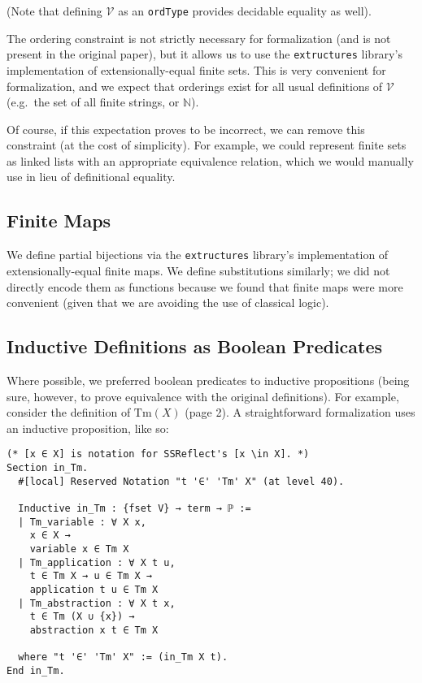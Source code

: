 \documentclass{article}
\begin{document}
(Note that defining $\mathcal{V}$ as an \verb|ordType| provides decidable equality as well).

The ordering constraint is not strictly necessary for formalization (and is not present in the
original paper), but it allows us to use the \verb|extructures| library's implementation of
extensionally-equal finite sets. This is very convenient for formalization, and we expect
that orderings exist for all usual definitions of $\mathcal{V}$ (e.g.\ the set of all finite
strings, or $\mathbb{N}$).

Of course, if this expectation proves to be incorrect, we can remove
this constraint (at the cost of simplicity). For example, we could represent finite sets as linked
lists with an appropriate equivalence relation, which we would manually use in lieu of definitional
equality.

\subsection{Finite Maps}

We define partial bijections via the \verb|extructures| library's implementation of
extensionally-equal finite maps. We define substitutions similarly; we did not directly encode them
as functions because we found that finite maps were more convenient (given that we are avoiding
the use of classical logic).

\subsection{Inductive Definitions as Boolean Predicates}

Where possible, we preferred boolean predicates to inductive propositions (being sure, however, to prove
equivalence with the original definitions). For example,
consider the definition of $\textrm{Tm}(X)$ (page 2). A straightforward formalization uses
an inductive proposition, like so:

\begin{verbatim}
(* [x ∈ X] is notation for SSReflect's [x \in X]. *)
Section in_Tm.
  #[local] Reserved Notation "t '∈' 'Tm' X" (at level 40).

  Inductive in_Tm : {fset V} → term → ℙ :=
  | Tm_variable : ∀ X x,
    x ∈ X →
    variable x ∈ Tm X
  | Tm_application : ∀ X t u,
    t ∈ Tm X → u ∈ Tm X →
    application t u ∈ Tm X
  | Tm_abstraction : ∀ X t x,
    t ∈ Tm (X ∪ {x}) →
    abstraction x t ∈ Tm X

  where "t '∈' 'Tm' X" := (in_Tm X t).
End in_Tm.
\end{verbatim}
\end{document}
